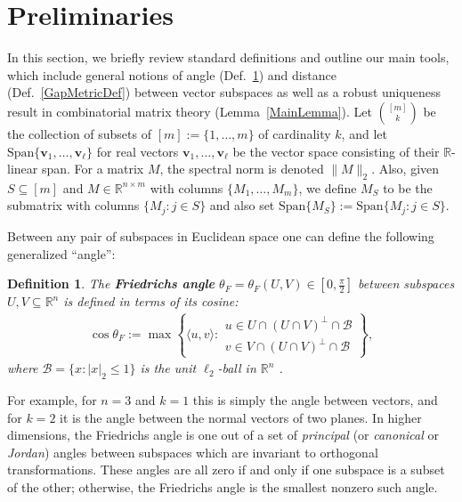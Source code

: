 \documentclass[journal, twocolumn]{IEEEtran}
\newtheorem{definition}{Definition}
\begin{document}
\section{Preliminaries}\label{Preliminaries}
In this section, we briefly review standard definitions and outline our main tools, which include general notions of angle (Def.~\ref{FriedrichsDefinition}) and distance (Def.~\ref{GapMetricDef}) between vector subspaces as well as a robust uniqueness result in combinatorial matrix theory (Lemma~\ref{MainLemma}).
Let ${[m] \choose k}$ be the collection of subsets of $[m] := \{1,\ldots,m\}$ of cardinality $k$, and let $\text{Span}\{\mathbf{v}_1, \ldots, \mathbf{v}_\ell\}$ for real vectors $\mathbf{v}_1, \ldots, \mathbf{v}_\ell$ be the vector space consisting of their $\mathbb{R}$-linear span.  For a matrix $M$, the spectral norm is denoted $\|M\|_2$.
Also, given $S \subseteq [m]$ and $M \in \mathbb{R}^{n \times m}$ with columns $\{M_1,\ldots,M_m\}$, we define $M_S$ to be the submatrix with columns $\{M_j: j \in S\}$ and also set $\text{Span}\{M_S\} := \text{Span}\{M_j : j \in S\}$.  

Between any pair of subspaces in Euclidean space one can define the following generalized ``angle'':
\begin{definition}\label{FriedrichsDefinition}
The \textbf{Friedrichs angle} $\theta_F = \theta_F(U,V) \in [0,\frac{\pi}{2}]$ between subspaces $U,V \subseteq \mathbb{R}^n$ is defined in terms of its cosine:
\begin{align}
\cos{\theta_F} := \max\left\{ \langle u, v \rangle: \substack{ u \in U \cap (U \cap V)^\perp \cap \mathcal{B} \\ v \in V \cap (U \cap V)^\perp \cap \mathcal{B} } \right\},
\end{align}
where $\mathcal{B} = \{ x: |x|_2 \leq 1\}$ is the unit $\ell_2$-ball in $\mathbb{R}^n$ \cite{Deutsch12}.
\end{definition}
For example, for $n=3$ and $k=1$ this is simply the angle between vectors, and for $k=2$ it is the angle between the normal vectors of two planes. In higher dimensions, the Friedrichs angle is one out of a set of \textit{principal} (or \textit{canonical} or \textit{Jordan}) angles between subspaces which are invariant to orthogonal transformations. These angles are all zero if and only if one subspace is a subset of the other; otherwise, the Friedrichs angle is the smallest nonzero such angle. 
\end{document}
